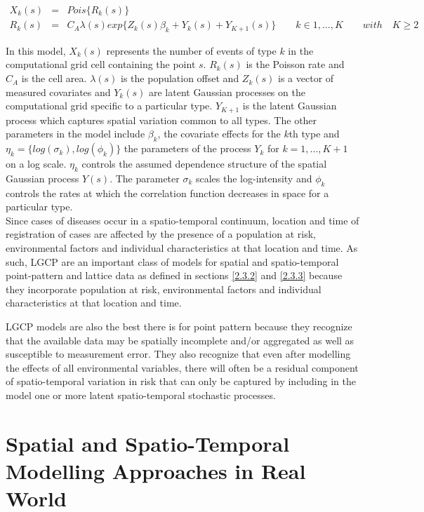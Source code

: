 \documentclass[12pt,a4paper]{report}
\begin{document}
\begin{eqnarray} \label{eqn2}
X_k(s) &=& Pois \lbrace R_k(s)\rbrace \nonumber \\
R_k(s) &=& C_A \lambda(s) exp \lbrace Z_k(s)\beta_k + Y_k(s) + Y_{K+1}(s)\rbrace \quad \quad k \in 1,...,K \quad  \quad  with \quad  K\geq 2
\end{eqnarray}


In this model, $X_k(s)$ represents the number of events of type $k$ in the computational grid cell containing the point $s$. $R_k(s)$ is the Poisson rate and $C_A$ is the cell area. $\lambda(s)$ is the population offset and $Z_k(s)$ is a vector of measured covariates and $Y_k(s)$ are latent Gaussian processes on the computational grid specific to a particular type. $Y_{K+1}$ is the latent Gaussian process which captures spatial variation common to all types. The other parameters in the model include $\beta_k$, the covariate effects for the $k$th type and $\eta_k = \lbrace log(\sigma_k),log(\phi_k)\rbrace$ the parameters of the process $Y_k$ for $k = 1,...,K+1$ on a log scale.  $\eta_k$ controls the assumed dependence structure of the spatial Gaussian process $Y(s)$. The parameter $\sigma_k$ scales the log-intensity and $\phi_k$ controls the rates at which the correlation function decreases in space for a particular type.\cite{Taylor2015}\\

Since cases of diseases occur in a spatio-temporal continuum, location and time of registration of cases are affected by the presence of a population at risk, environmental factors and individual characteristics at that location and time. As such, LGCP are an important class of models for spatial and spatio-temporal point-pattern and lattice data as defined in sections \ref{2.3.2} and \ref{2.3.3} because they incorporate population at risk, environmental factors and individual characteristics at that location and time.\cite{Taylor2015} 

LGCP models are also the best there is for point pattern because they recognize that the available data may be spatially incomplete and/or aggregated as well as susceptible to measurement error. They also recognize that even after modelling the effects of all environmental variables, there will often be a
residual component of spatio-temporal variation in risk that can only be captured by including in the model one or more latent spatio-temporal stochastic processes.\cite{Taylor2015}

\section{Spatial and Spatio-Temporal Modelling Approaches in Real World}
\end{document}
